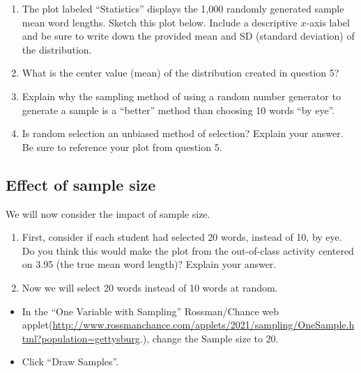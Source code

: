 \documentclass[
]{report}
\begin{document}
\begin{enumerate}
\def\labelenumi{\arabic{enumi}.}
\setcounter{enumi}{4}
\item
  The plot labeled ``Statistics'' displays the 1,000 randomly generated sample mean word lengths. Sketch this plot below. Include a descriptive \(x\)-axis label and be sure to write down the provided mean and SD (standard deviation) of the distribution.
  \vspace{2in}
\item
  What is the center value (mean) of the distribution created in question 5?
  \vspace{0.3in}
\item
  Explain why the sampling method of using a random number generator to generate a sample is a ``better'' method than choosing 10 words ``by eye''.
  \vspace{0.8in}
\item
  Is random selection an unbiased method of selection? Explain your answer. Be sure to reference your plot from question 5.
  \vspace{0.5in}
\end{enumerate}

\hypertarget{effect-of-sample-size}{%
\subsection*{Effect of sample size}\label{effect-of-sample-size}}

We will now consider the impact of sample size.

\begin{enumerate}
\def\labelenumi{\arabic{enumi}.}
\setcounter{enumi}{8}
\item
  First, consider if each student had selected 20 words, instead of 10, by eye. Do you think this would make the plot from the out-of-class activity centered on 3.95 (the true mean word length)? Explain your answer.
  \vspace{0.4in}
\item
  Now we will select 20 words instead of 10 words at random.
\end{enumerate}

\begin{itemize}
\item
  In the ``One Variable with Sampling'' Rossman/Chance web applet(\url{http://www.rossmanchance.com/applets/2021/sampling/OneSample.html?population=gettysburg}.), change the Sample size to 20.
\item
  Click ``Draw Samples''.
\end{itemize}
\end{document}
